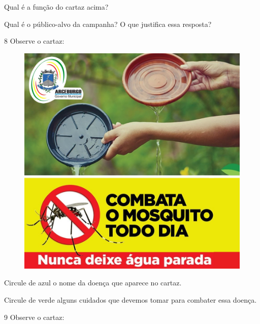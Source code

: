 \begin{escolha}
\item Qual é a função do cartaz acima?


\item Qual é o público-alvo da campanha? O que justifica essa resposta?

\end{escolha}

\num{8} Observe o cartaz:

\begin{figure}[H]
\centering
\includegraphics[width=.8\textwidth]{media/image134.jpg}
\end{figure}


\begin{escolha}
\item Circule de azul o nome da doença que aparece no cartaz.

\item Circule de verde alguns cuidados que devemos tomar para combater essa doença.
\end{escolha}

\num{9} Observe o cartaz:

